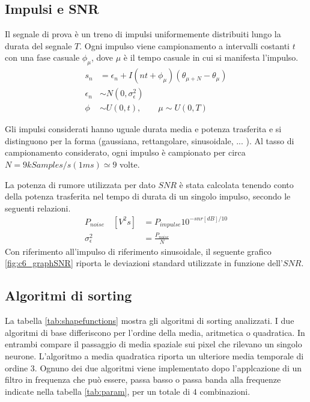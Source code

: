 \documentclass[9pt,twocolumn,twoside]{osajnl}
\begin{document}
\subsection{Impulsi e SNR}

Il segnale di prova è un treno di impulsi uniformemente distribuiti lungo la durata del segnale $T$. Ogni impulso viene campionamento a intervalli costanti $t$ con una fase casuale $\phi_{\mu}$, dove $\mu$ è il tempo casuale in cui si manifesta l'impulso. 
\begin{align*}
 s_{n} &= \epsilon_{n} + I(nt + \phi_{\mu})(\theta_{\mu+N} - \theta_{\mu})    \\
 \epsilon_{n} & \sim N(0,\sigma^{2}_{\epsilon})   \\
 \phi & \sim U(0,t), \quad\quad \mu  \sim  U(0,T )
\end{align*}

Gli impulsi considerati hanno uguale durata media e potenza trasferita e si distinguono per la forma (gaussiana, rettangolare, sinusoidale, ... ). Al tasso di campionamento considerato, ogni impulso è campionato per circa $N = 9kSamples/s (1ms) \simeq 9$ volte.

La potenza di rumore utilizzata per dato $SNR$ è stata calcolata tenendo conto della potenza trasferita nel tempo di durata di un singolo impulso, secondo le seguenti relazioni.
\begin{align*}
P_{noise} \quad [V^2s] &=  P_{impulse} 10^{- snr [dB]/10} \\
\sigma^{2}_{\epsilon} &= \frac{ P_{noise} }{ N }
\end{align*}
Con riferimento all'impulso di riferimento sinusoidale, il seguente grafico \ref{fig:c6_graphSNR} riporta le deviazioni standard utilizzate in funzione dell'$SNR$.
%



\subsection{Algoritmi di sorting}

La tabella \ref{tab:shapefunctions} mostra gli algoritmi di sorting analizzati.
I due algoritmi di base differiscono per l'ordine della media, aritmetica o quadratica. In entrambi compare il passaggio di media spaziale sui pixel che rilevano un singolo neurone. L'algoritmo a media quadratica riporta un ulteriore media temporale di ordine $3$. Ognuno dei due algoritmi viene implementato dopo l'applcazione di un filtro in frequenza che può essere, passa basso o passa banda alla frequenze indicate nella tabella \ref{tab:param}, per un totale di $4$ combinazioni.
\end{document}

